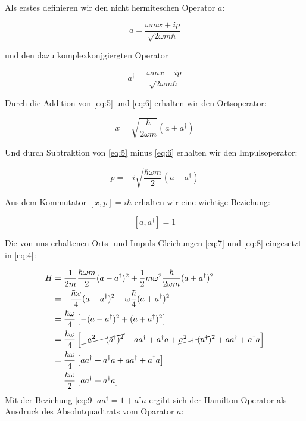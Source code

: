 Als erstes definieren wir den nicht hermiteschen Operator \(a\):

\begin{equation}
  \label{eq:5}
  a = \frac{\omega m x+ip}{\sqrt{2\omega m\hbar}}  
\end{equation}

und den dazu komplexkonjgiergten Operator

\begin{equation}
  \label{eq:6}
  a^\dagger = \frac{\omega m x-ip}{\sqrt{2\omega m\hbar}}
\end{equation}

Durch die Addition von \eqref{eq:5} und  \eqref{eq:6} erhalten wir den Ortsoperator:

\begin{equation}
  \label{eq:7}
  x = \sqrt{\frac{\hbar}{2\omega m}}(a+a^\dagger)
\end{equation}

Und durch Subtraktion von \eqref{eq:5} minus \eqref{eq:6} erhalten wir den Impulsoperator:

\begin{equation}
  \label{eq:8}
  p = -i\sqrt{\frac{\hbar \omega m}{2}}(a-a^\dagger)
\end{equation}

Aus dem Kommutator \([x,p]=i\hbar\) erhalten wir eine wichtige Beziehung:

\begin{equation}
  \label{eq:9}
  \boxed{[a,a^\dagger]=1}
\end{equation}

Die von uns erhaltenen Orts- und Impuls-Gleichungen \eqref{eq:7} und \eqref{eq:8} eingesetzt in \eqref{eq:4}:


\begin{align}
  \label{eq:10}
   H &= \frac{1}{2m}\frac{\hbar \omega m}{2}(a-a^\dagger)^2 +  \frac{1}{2}m\omega^2\frac{\hbar}{2\omega m}(a+a^\dagger)^2 \\
&= -\frac{\hbar \omega}{4}(a-a^\dagger)^2 +  \omega\frac{\hbar}{4}(a+a^\dagger)^2 \\
&= \frac{\hbar \omega}{4}\left[-(a-a^\dagger)^2 + (a+a^\dagger)^2\right] \\
&= \frac{\hbar \omega}{4}\left[\cancel{-a^2-(a^\dagger)^2}+aa^\dagger+a^\dagger a +\cancel{a^2+(a^\dagger)^2}+aa^\dagger+a^\dagger a \right] \\
&= \frac{\hbar \omega}{4}\left[aa^\dagger+a^\dagger a +aa^\dagger+a^\dagger a \right] \\
&= \frac{\hbar \omega}{2}\left[aa^\dagger+a^\dagger a \right] \\
\end{align}
Mit der Beziehung \eqref{eq:9} \(aa^\dagger = 1 + a^\dagger a \) ergibt sich der Hamilton Operator als Ausdruck des Absolutquadtrats vom Oparator \(a\):

